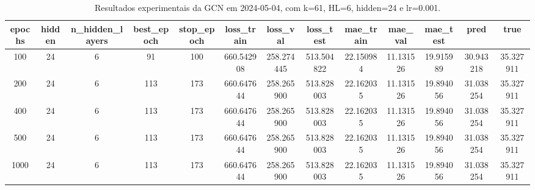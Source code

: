 \begin{table}[h]
\centering
\caption{Resultados experimentais da GCN em 2024-05-04, com k=61, HL=6, hidden=24 e lr=0.001.}
\label{tab:gcn_results_k61_hl6_h24_d20240504}
\begin{tabular}{ccccccccccccc}
\toprule
epochs & hidden & n\_hidden\_layers & best\_epoch & stop\_epoch & loss\_train & loss\_val & loss\_test & mae\_train & mae\_val & mae\_test & pred & true \\
\midrule
100 & 24 & 6 & 91 & 100 & 660.542908 & 258.274445 & 513.504822 & 22.150984 & 11.131526 & 19.915989 & 30.943218 & 35.327911 \\
200 & 24 & 6 & 113 & 173 & 660.647644 & 258.265900 & 513.828003 & 22.162035 & 11.131526 & 19.894056 & 31.038254 & 35.327911 \\
400 & 24 & 6 & 113 & 173 & 660.647644 & 258.265900 & 513.828003 & 22.162035 & 11.131526 & 19.894056 & 31.038254 & 35.327911 \\
500 & 24 & 6 & 113 & 173 & 660.647644 & 258.265900 & 513.828003 & 22.162035 & 11.131526 & 19.894056 & 31.038254 & 35.327911 \\
1000 & 24 & 6 & 113 & 173 & 660.647644 & 258.265900 & 513.828003 & 22.162035 & 11.131526 & 19.894056 & 31.038254 & 35.327911 \\
\bottomrule
\end{tabular}
\end{table}
